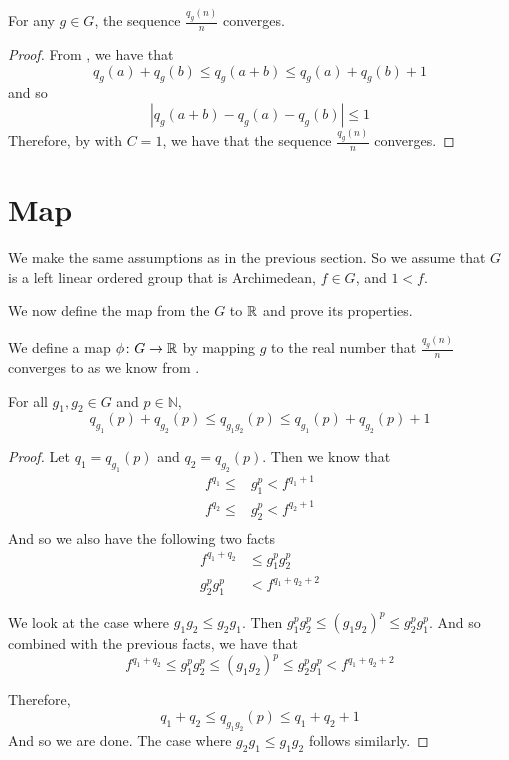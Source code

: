 \begin{theorem}\label{q_convergence}
    \leanok{}
    For any $g \in G$, the sequence $\frac{q_g(n)}{n}$ converges.
\end{theorem}
\begin{proof}\leanok
From , we have that
\[
q_g(a) + q_g(b) \le q_g(a+b) \le q_g(a)+q_g(b) + 1
\]
and so
\[
|q_g(a+b) - q_g(a) - q_g(b)| \le 1
\]
Therefore, by  with $C = 1$, we have that
the sequence $\frac{q_g(n)}{n}$ converges.
\end{proof}

\section{Map}
We make the same assumptions as in the previous section.
So we assume that $G$ is a left linear ordered group
that is Archimedean, $f\in G$, and $1 < f$.

We now define the map from the $G$ to $\mathbb{R}$ and prove its properties.

\begin{definition}\label{def:phi}
    \leanok{}
    We define a map $\phi\colon G \to \mathbb{R}$ by mapping $g$
    to the real number that $\frac{q_g(n)}{n}$ converges to
    as we know from .
\end{definition}

\begin{theorem}\label{phi_hom_case}
    \leanok{}
    For all $g_1,g_2 \in G$ and $p\in \mathbb{N}$,
    \[
    q_{g_1}(p) + q_{g_2}(p) \le q_{g_1g_2}(p) \le q_{g_1}(p) + q_{g_2}(p) + 1
    \]
\end{theorem}
\begin{proof}\leanok
Let $q_1 = q_{g_1}(p)$ and $q_2 = q_{g_2}(p)$. Then we know that
\begin{align*}
f^{q_1} \le &g_1^p < f^{q_1+1}\\
f^{q_2} \le &g_2^p < f^{q_2+1}\\
\end{align*}
And so we also have the following two facts
\begin{align*}
f^{q_1+q_2}&\le g_1^p g_2^p\\
g_2^p g_1^p& < f^{q_1 + q_2 + 2}
\end{align*}

We look at the case where $g_1g_2 \le g_2g_1$.
Then $g_1^p g_2^p \le (g_1g_2)^p \le g_2^p g_1^p$.
And so combined with the previous facts, we have that
\[
f^{q_1+q_2}\le g_1^p g_2^p \le (g_1g_2)^p \le g_2^p g_1^p < f^{q_1+q_2+2}
\]

Therefore,
\[
q_1+q_2 \le q_{g_1g_2}(p) \le q_1+q_2+1
\]
And so we are done.
The case where $g_2g_1 \le g_1g_2$ follows similarly.
\end{proof}

